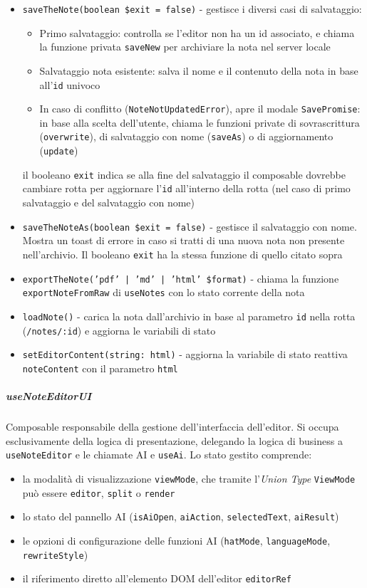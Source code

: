 \documentclass[a4paper,10pt]{article}
\begin{document}
\begin{itemize}
    \item \texttt{saveTheNote(boolean \$exit = false)} - gestisce i diversi casi di salvataggio:
    \begin{itemize}
        \item Primo salvataggio: controlla se l'editor non ha un id associato, e chiama la funzione privata \texttt{saveNew} per archiviare la nota nel server locale
        \item Salvataggio nota esistente: salva il nome e il contenuto della nota in base all'\texttt{id} univoco
        \item In caso di conflitto (\texttt{NoteNotUpdatedError}), apre il modale \texttt{SavePromise}: in base alla scelta dell'utente, chiama le funzioni private di sovrascrittura (\texttt{overwrite}), di salvataggio con nome (\texttt{saveAs}) o di aggiornamento (\texttt{update})
    \end{itemize}
    il booleano \texttt{exit} indica se alla fine del salvataggio il composable dovrebbe cambiare rotta per aggiornare l'\texttt{id} all'interno della rotta (nel caso di primo salvataggio e del salvataggio con nome)
    \item \texttt{saveTheNoteAs(boolean \$exit = false)} - gestisce il salvataggio con nome. Mostra un toast di errore in caso si tratti di una nuova nota non presente nell'archivio. Il booleano \texttt{exit} ha la stessa funzione di quello citato sopra
    \item \texttt{exportTheNote('pdf' | 'md' | 'html' \$format)} - chiama la funzione \texttt{exportNoteFromRaw} di \texttt{useNotes} con lo stato corrente della nota
    \item \texttt{loadNote()} - carica la nota dall'archivio in base al parametro \texttt{id} nella rotta (\texttt{/notes/:id}) e aggiorna le variabili di stato
    \item \texttt{setEditorContent(string: html)} - aggiorna la variabile di stato reattiva \texttt{noteContent} con il parametro \texttt{html}
\end{itemize}
\subparagraph{useNoteEditorUI} Composable responsabile della gestione dell'interfaccia dell'editor. Si occupa esclusivamente della logica di presentazione, delegando la logica di business a \texttt{useNoteEditor} e le chiamate AI e \texttt{useAi}. Lo stato gestito comprende:
\begin{itemize}
    \item la modalità di visualizzazione \texttt{viewMode}, che tramite l'\textit{Union Type} \texttt{ViewMode} può essere \texttt{editor}, \texttt{split} o \texttt{render}
    \item lo stato del pannello AI (\texttt{isAiOpen}, \texttt{aiAction}, \texttt{selectedText}, \texttt{aiResult})
    \item le opzioni di configurazione delle funzioni AI (\texttt{hatMode}, \texttt{languageMode}, \texttt{rewriteStyle})
    \item il riferimento diretto all'elemento DOM dell'editor \texttt{editorRef}
\end{itemize}
\end{document}
